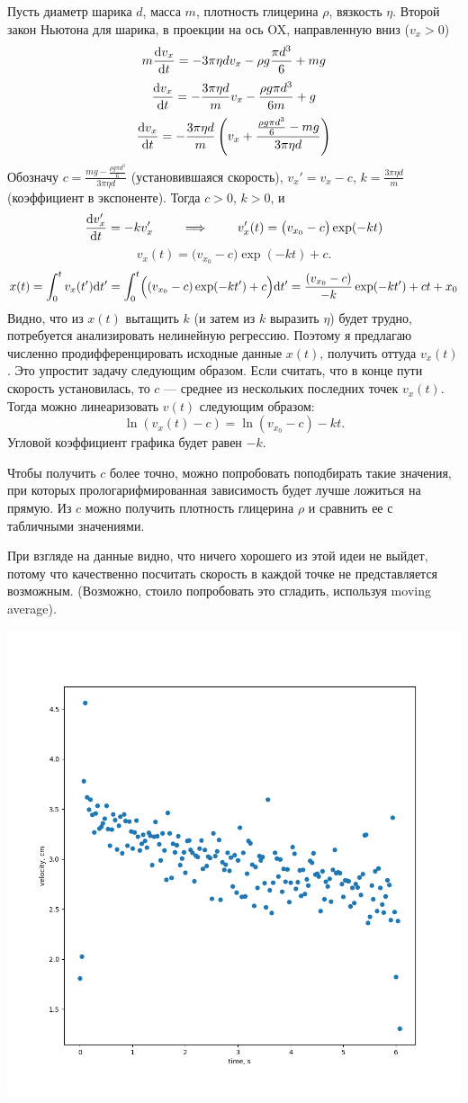 \documentclass[a4paper, 12pt]{article}
\begin{document}
Пусть диаметр шарика $d$, масса $m$, плотность глицерина $\rho$, вязкость $\eta$.
Второй закон Ньютона для шарика, в проекции на ось OX, направленную вниз ($v_x > 0$)
\[ m \dv{v_x}{t} = -3 \pi \eta d v_x - \rho g \frac{\pi d^3}6 + mg \]
\[ \dv{v_x}{t} = -\frac{3 \pi \eta d}m v_x - \frac{\rho g \pi d^3}{6 m} + g \]
\[ \dv{v_x}{t} = -\frac{3 \pi \eta d}m \left(v_x + \frac{\frac{\rho g \pi d^3}{6} - mg}{3 \pi \eta d}\right) \]
Обозначу $c = \frac{mg - \frac{\rho g \pi d^3}{6}}{3 \pi \eta d}$ (установившаяся скорость), $v_x' = v_x - c$, $k = \frac{3 \pi \eta d}m$ (коэффициент в экспоненте).
Тогда $c > 0$, $k > 0$, и
\[ \dv{v_x'}{t} = -k v_x' \qquad\implies\qquad v_x'(t) = \bigl(v_{x_0} - c\bigr)\exp(-kt) \]
\[ v_x(t) = \bigl(v_{x_0} -  c\bigr)\exp(-kt) + c .\]
\[
x(t) = \int_{0}^t v_x(t') \dd t' = \int_{0}^t \Bigl((v_{x_0} -  c)\exp(-kt') + c\Bigr) \dd t' =
	   \frac{(v_{x_0} -  c)}{-k}\exp(-kt') + ct + x_0
\]
Видно, что из $x(t)$ вытащить $k$ (и затем из $k$ выразить $\eta$) будет трудно, потребуется анализировать нелинейную регрессию.
Поэтому я предлагаю численно продифференцировать исходные данные $x(t)$, получить оттуда $v_x(t)$.
Это упростит задачу следующим образом.
Если считать, что в конце пути скорость установилась, то $c$ --- среднее из нескольких последних точек $v_x(t)$.
Тогда можно линеаризовать $v(t)$ следующим образом:
\[ \ln( v_x(t) - c ) = \ln(v_{x_0} -  c) - k t .\] 
Угловой коэффициент графика будет равен $-k$.

Чтобы получить $c$ более точно, можно попробовать поподбирать такие значения, при которых прологарифмированная зависимость будет лучше ложиться на прямую.
Из $c$ можно получить плотность глицерина $\rho$ и сравнить ее с табличными значениями.

При взгляде на данные видно, что ничего хорошего из этой идеи не выйдет, потому что качественно посчитать скорость в каждой точке не представляется возможным.
(Возможно, стоило попробовать это сгладить, используя moving average).
\begin{center}
\includegraphics[width=0.6\linewidth]{bad_numericall_differentiation.png}
\end{center}
\end{document}
